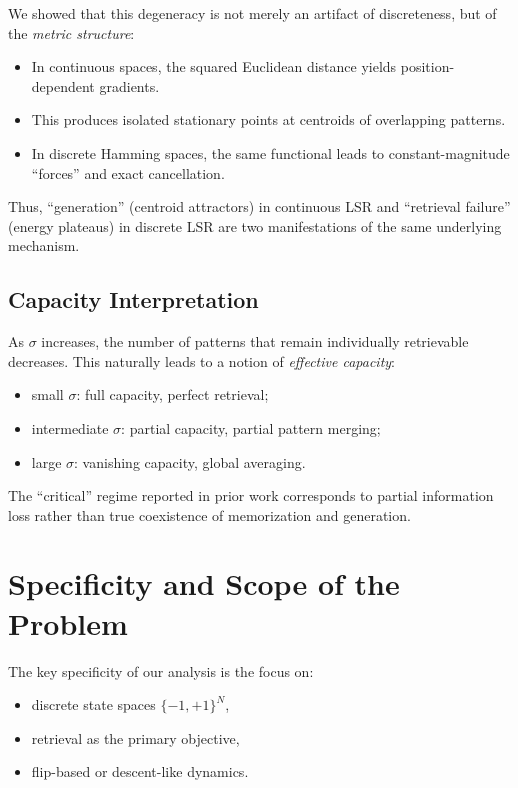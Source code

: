 \documentclass[11pt,a4paper]{article}
\begin{document}
We showed that this degeneracy is not merely an artifact of discreteness, but of the \emph{metric structure}:
\begin{itemize}
    \item In continuous spaces, the squared Euclidean distance yields position-dependent gradients.
    \item This produces isolated stationary points at centroids of overlapping patterns.
    \item In discrete Hamming spaces, the same functional leads to constant-magnitude ``forces'' and exact cancellation.
\end{itemize}

Thus, ``generation'' (centroid attractors) in continuous LSR and ``retrieval failure'' (energy plateaus) in discrete LSR are two manifestations of the same underlying mechanism.

\subsection{Capacity Interpretation}

As $\sigma$ increases, the number of patterns that remain individually retrievable decreases. This naturally leads to a notion of \emph{effective capacity}:
\begin{itemize}
    \item small $\sigma$: full capacity, perfect retrieval;
    \item intermediate $\sigma$: partial capacity, partial pattern merging;
    \item large $\sigma$: vanishing capacity, global averaging.
\end{itemize}

The ``critical'' regime reported in prior work corresponds to partial information loss rather than true coexistence of memorization and generation.

\section{Specificity and Scope of the Problem}

The key specificity of our analysis is the focus on:
\begin{itemize}
    \item discrete state spaces $\{-1,+1\}^N$,
    \item retrieval as the primary objective,
    \item flip-based or descent-like dynamics.
\end{itemize}
\end{document}
